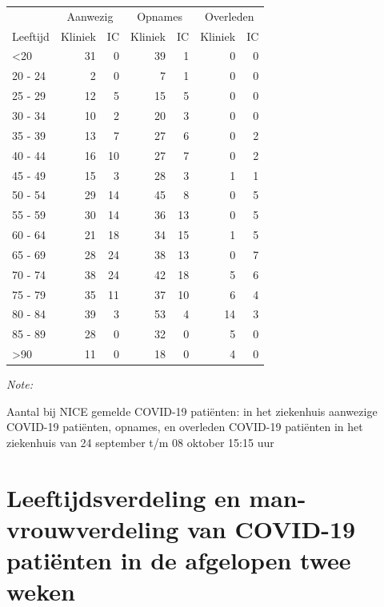 \documentclass[
  english,
  man,floatsintext]{apa6}
\begin{document}
\begin{table}
\centering\begingroup\fontsize{10}{12}\selectfont

\begin{threeparttable}
\begin{tabular}{lrrrrrr}
\toprule
\multicolumn{1}{c}{ } & \multicolumn{2}{c}{Aanwezig} & \multicolumn{2}{c}{Opnames} & \multicolumn{2}{c}{Overleden} \\
\cmidrule(l{3pt}r{3pt}){2-3} \cmidrule(l{3pt}r{3pt}){4-5} \cmidrule(l{3pt}r{3pt}){6-7}
Leeftijd & Kliniek & IC & Kliniek & IC & Kliniek & IC\\
\midrule
<20 & 31 & 0 & 39 & 1 & 0 & 0\\
20 - 24 & 2 & 0 & 7 & 1 & 0 & 0\\
25 - 29 & 12 & 5 & 15 & 5 & 0 & 0\\
30 - 34 & 10 & 2 & 20 & 3 & 0 & 0\\
35 - 39 & 13 & 7 & 27 & 6 & 0 & 2\\
40 - 44 & 16 & 10 & 27 & 7 & 0 & 2\\
45 - 49 & 15 & 3 & 28 & 3 & 1 & 1\\
50 - 54 & 29 & 14 & 45 & 8 & 0 & 5\\
55 - 59 & 30 & 14 & 36 & 13 & 0 & 5\\
60 - 64 & 21 & 18 & 34 & 15 & 1 & 5\\
65 - 69 & 28 & 24 & 38 & 13 & 0 & 7\\
70 - 74 & 38 & 24 & 42 & 18 & 5 & 6\\
75 - 79 & 35 & 11 & 37 & 10 & 6 & 4\\
80 - 84 & 39 & 3 & 53 & 4 & 14 & 3\\
85 - 89 & 28 & 0 & 32 & 0 & 5 & 0\\
>90 & 11 & 0 & 18 & 0 & 4 & 0\\
\bottomrule
\end{tabular}
\begin{tablenotes}
\item \textit{Note: } 
\item Aantal bij NICE gemelde COVID-19 patiënten: in het ziekenhuis aanwezige COVID-19 patiënten, opnames, en overleden COVID-19 patiënten in het ziekenhuis van 24 september t/m 08 oktober 15:15 uur
\end{tablenotes}
\end{threeparttable}
\endgroup{}
\end{table}

\newpage

\hypertarget{leeftijdsverdeling-en-man-vrouwverdeling-van-covid-19-patiuxebnten-in-de-afgelopen-twee-weken}{%
\section{Leeftijdsverdeling en man-vrouwverdeling van COVID-19 patiënten in de afgelopen twee weken}\label{leeftijdsverdeling-en-man-vrouwverdeling-van-covid-19-patiuxebnten-in-de-afgelopen-twee-weken}}
\end{document}
